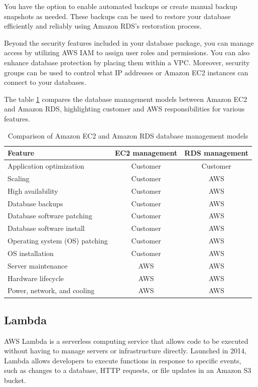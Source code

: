 You have the option to enable automated backups or create manual backup snapshots as needed. These backups can be used to restore your database efficiently and reliably using Amazon \ac{RDS}'s restoration process.

Beyond the security features included in your database package, you can manage access by utilizing \ac{AWS} \ac{IAM} to assign user roles and permissions. You can also enhance database protection by placing them within a \ac{VPC}. Moreover, security groups can be used to control what IP addresses or Amazon \ac{EC2} instances can connect to your databases.


The table \ref{tab:ec2vsrds} compares the database management models between Amazon \ac{EC2} and Amazon \ac{RDS}, highlighting customer and \ac{AWS} responsibilities for various features.

\begin{table}[ht]
    \centering
    \begin{tabular}{|l|c|c|}
    \hline
    \textbf{Feature} & \textbf{\ac{EC2} management} & \textbf{\ac{RDS} management} \\ \hline
    Application optimization & Customer & Customer \\ \hline
    Scaling & Customer & AWS \\ \hline
    High availability & Customer & AWS \\ \hline
    Database backups & Customer & AWS \\ \hline
    Database software patching & Customer & AWS \\ \hline
    Database software install & Customer & AWS \\ \hline
    Operating system (OS) patching & Customer & AWS \\ \hline
    OS installation & Customer & AWS \\ \hline
    Server maintenance & AWS & AWS \\ \hline
    Hardware lifecycle & AWS & AWS \\ \hline
    Power, network, and cooling & AWS & AWS \\ \hline
    \end{tabular}
    \caption{Comparison of Amazon \ac{EC2} and Amazon \ac{RDS} database management models}
    \label{tab:ec2vsrds}
\end{table}

\subsection{Lambda}
\ac{AWS} Lambda is a serverless computing service that allows code to be executed without having to manage servers or infrastructure directly. Launched in 2014, Lambda allows developers to execute functions in response to specific events, such as changes to a database, \ac{HTTP} requests, or file updates in an Amazon \ac{S3} bucket.

